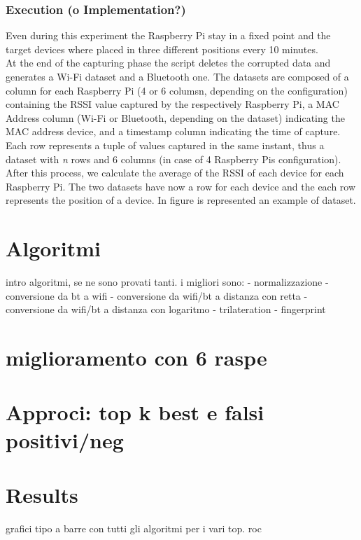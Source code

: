 \subsubsection{Execution (o Implementation?)}
Even during this experiment the Raspberry Pi stay in a fixed point and the target devices where placed in three different positions every 10 minutes. \\
At the end of the capturing phase the script deletes the corrupted data and generates a Wi-Fi dataset and a Bluetooth one. The datasets are composed of a column for each Raspberry Pi (4 or 6 columsn, depending on the configuration) containing the RSSI value captured by the respectively Raspberry Pi, a MAC Address column (Wi-Fi or Bluetooth, depending on the dataset) indicating the MAC address device, and a timestamp column indicating the time of capture. Each row represents a tuple of values captured in the same instant, thus a dataset with \textit{n} rows and 6 columns (in case of 4 Raspberry Pis configuration).\\
After this process, we calculate the average of the RSSI of each device for each Raspberry Pi. The two datasets have now a row for each device and the each row represents the position of a device. In figure is represented an example of dataset.

\section{Algoritmi}
intro algoritmi, se ne sono provati tanti. i migliori sono: 
- normalizzazione
- conversione da bt a wifi
- conversione da wifi/bt a distanza con retta
- conversione da wifi/bt a distanza con logaritmo
- trilateration
- fingerprint

\section{miglioramento con 6 raspe}

\section{Approci: top k best e falsi positivi/neg	}


\section{Results}
grafici tipo a barre con tutti gli algoritmi per i vari top.
roc